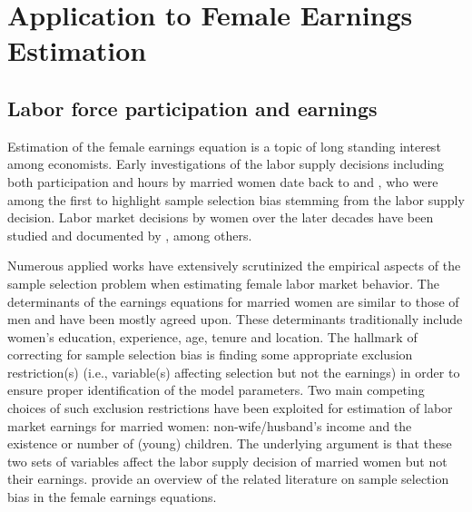 \documentclass[11pt]{article}
\begin{document}
\section{Application to Female Earnings Estimation} \label{sec:app}
\subsection{Labor force participation and earnings}
Estimation of the female earnings equation is a topic of long standing interest among economists.
Early investigations of the labor supply decisions including both participation and hours by married women date back to \cite{gronau:74} and \cite{heckman:74}, who were among the first
to highlight sample selection bias stemming from the labor supply decision. %
Labor market decisions by women over
the later decades have been studied and documented by \cite{Mroz:87, ahn/power:93, neumark/korenman:94, vella:98, devereux:04, blau/kahn:07, mulligan/rubinstein:08, cavalcanti:08, bar/etal:15}, among others.

Numerous applied works have extensively scrutinized the empirical aspects of the
sample selection problem when estimating female labor market behavior. The
determinants of the earnings equations for married women are similar to those of
men and have been mostly agreed upon. These determinants traditionally include
women’s education, experience, age, tenure and location. %
The hallmark of correcting for sample selection bias is finding some appropriate
exclusion restriction(s) (i.e., variable(s) affecting selection but not the earnings) %
in order to ensure proper identification of the model
parameters. Two main competing choices of such exclusion restrictions have been
exploited for estimation of labor market earnings for married women:
non-wife/husband’s income and the existence or number of (young) children. The
underlying argument is that these two sets of variables affect the labor supply decision
of married women but not their earnings. \cite{huber/mellace:14}
provide an overview of the related literature on sample selection bias in
the female earnings equations. 
\end{document}
